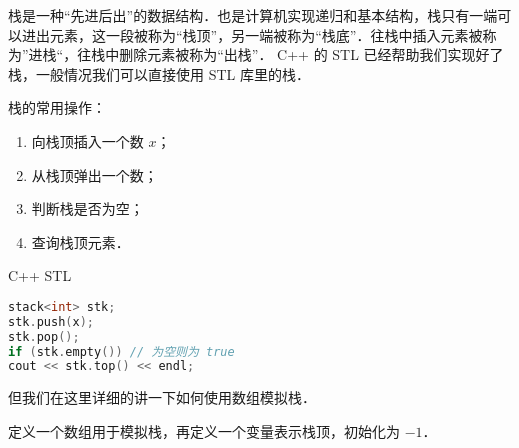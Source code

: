 
栈是一种“先进后出”的数据结构．也是计算机实现递归和基本结构，栈只有一端可以进出元素，这一段被称为“栈顶”，另一端被称为“栈底”．往栈中插入元素被称为”进栈“，往栈中删除元素被称为“出栈”．
C++ 的 STL 已经帮助我们实现好了栈，一般情况我们可以直接使用 STL 库里的栈．

栈的常用操作：
\begin{enumerate}
\item 向栈顶插入一个数 $x$；
\item 从栈顶弹出一个数；
\item 判断栈是否为空；
\item 查询栈顶元素．
\end{enumerate}

C++ STL
\begin{lstlisting}[language=cpp]
stack<int> stk;
stk.push(x);
stk.pop();
if (stk.empty()) // 为空则为 true
cout << stk.top() << endl;
\end{lstlisting}

但我们在这里详细的讲一下如何使用数组模拟栈．

定义一个数组用于模拟栈，再定义一个变量表示栈顶，初始化为 $-1$．

